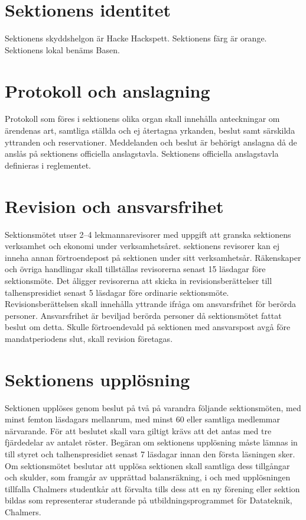 \documentclass[a4paper]{dteklag}
\begin{document}
\section{Sektionens identitet}
\para[Skyddshelgon] Sektionens skyddshelgon är Hacke Hackspett.
\para[Sektionsfärg] Sektionens färg är orange.
\para[Sektionslokal] Sektionens lokal benäms Basen.

\section{Protokoll och anslagning}
\para[Allmänt] Protokoll som föres i sektionens olika organ skall innehålla anteckningar om ärendenas art, samtliga ställda och ej återtagna yrkanden, beslut samt särskilda yttranden och reservationer.
\para[Anslagning] Meddelanden och beslut är behörigt anslagna då de anslås på sektionens officiella anslagstavla. Sektionens officiella anslagstavla definieras i reglementet.

\section{Revision och ansvarsfrihet}
\para[Revisorer] Sektionsmötet utser 2–4 lekmannarevisorer med uppgift att granska sektionens verksamhet och ekonomi under verksamhetsåret.
\stycke sektionens revisorer kan ej inneha annan förtroendepost på sektionen under sitt verksamhetsår.
\stycke Räkenskaper och övriga handlingar skall tillställas revisorerna senast 15 läsdagar före sektionsmöte.
\para Det åligger revisorerna att skicka in revisionsberättelser till talhenspresidiet senast 5 läsdagar före ordinarie sektionsmöte.
\stycke Revisionsberättelsen skall innehålla yttrande ifråga om ansvarsfrihet för berörda personer.
\para[Ansvarsfrihet] Ansvarsfrihet är beviljad berörda personer då sektionsmötet fattat beslut om detta.
\stycke Skulle förtroendevald på sektionen med ansvarspost avgå före mandatperiodens slut, skall revision företagas.

\section{Sektionens upplösning}
\para Sektionen upplöses genom beslut på två på varandra följande sektionsmöten, med minst femton läsdagars mellanrum, med minst 60 eller samtliga medlemmar närvarande.
\stycke För att beslutet skall vara giltigt krävs att det antas med tre fjärdedelar av antalet röster.
\para Begäran om sektionens upplösning måste lämnas in till styret och talhenspresidiet senast 7 läsdagar innan den första läsningen sker.
\para Om sektionsmötet beslutar att upplösa sektionen skall samtliga dess tillgångar och skulder, som framgår av upprättad balansräkning, i och med upplösningen tillfalla Chalmers studentkår att förvalta tills dess att en ny förening eller sektion bildas som representerar studerande på utbildningsprogrammet för Datateknik, Chalmers.
\end{document}
